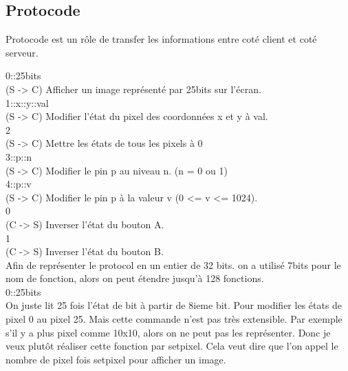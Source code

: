 \documentclass[14px]{article}
\begin{document}
\subsection{Protocode}
Protocode est un rôle de transfer les informations entre coté client et coté serveur.

0::25bits
~\\

(S -> C) Afficher un image représenté par 25bits sur l'écran.
~\\

1::x::y::val
~\\

(S -> C) Modifier l'état du pixel des coordonnées x et y à val.
~\\

2
~\\

(S -> C) Mettre les états de tous les pixels à 0
~\\

3::p::n
~\\

(S -> C) Modifier le pin p au niveau n. (n = 0 ou 1)
~\\

4::p::v
~\\

(S -> C) Modifier le pin p à la valeur v (0 <= v <= 1024).
~\\

0
~\\

(C -> S) Inverser l'état du bouton A.
~\\

1
~\\

(C -> S) Inverser l'état du bouton B.
~\\

Afin de représenter le protocol en un entier de 32 bits. on a utilisé 7bits pour le nom de fonction, alors on peut étendre jusqu'à 128 fonctions.
~\\

0::25bits
~\\

On juste lit 25 fois l'état de bit à partir de 8ieme bit. Pour modifier les états de pixel 0 au pixel 25. Mais cette commande n'est pas très extensible. Par exemple s'il y a plus pixel comme 10x10, alors on ne peut pas les représenter. Donc je veux plutôt réaliser cette fonction par setpixel. Cela veut dire que l'on appel le nombre de pixel fois setpixel pour afficher un image.
~\\
\end{document}
